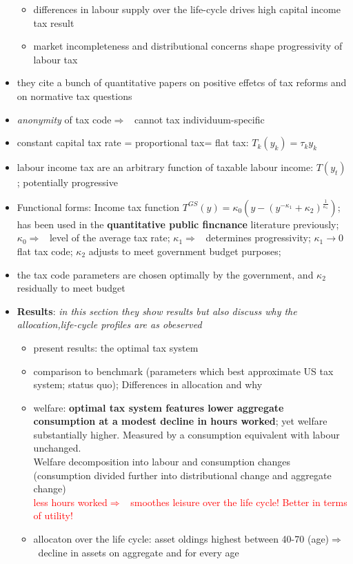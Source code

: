 \documentclass[12pt]{article}
\newcommand{\ar}{$\Rightarrow$ \ }
\newcommand{\tr}[1]{\textcolor{red}{#1}}
\begin{document}
\begin{itemize}
\begin{itemize}
\item differences in labour supply over the life-cycle drives high capital income tax result
\item market incompleteness and distributional concerns shape progressivity of labour tax
\end{itemize}
\item they cite a bunch of quantitative papers on positive effetcs of tax reforms and on normative tax questions
\item \textit{anonymity} of tax code\ar cannot tax individuum-specific
\item constant capital tax rate = proportional tax= flat tax: $T_k(y_k)=\tau_ky_k$
\item labour income tax are an arbitrary function of taxable labour income: $T(y_t)$; potentially progressive
\item Functional forms: Income tax function $T^{GS}(y)= \kappa_0(y-(y^{-\kappa_1}+\kappa_2)^{\frac{1}{\kappa_1}})$; has been used in the \textbf{quantitative public fincnance} literature previously; 
$\kappa_0$\ar level of the average tax rate; $\kappa_1$\ar determines progressivity; $\kappa_1\rightarrow0$ flat tax code; $\kappa_2$ adjusts to meet government budget purposes; 
\item the tax code parameters are chosen optimally by the government, and $\kappa_2$ residually to meet budget
\item \textbf{Results}: \textit{in this section they show results but also discuss why the allocation,life-cycle profiles are as obeserved} 
\begin{itemize}
\item present results: the optimal tax system
\item  comparison to benchmark (parameters which best approximate US tax system; status quo); Differences in allocation and why
\item welfare: \textbf{optimal tax system features lower aggregate consumption at a modest decline in hours worked}; yet welfare substantially higher. Measured by a consumption equivalent with labour unchanged. \\
Welfare decomposition into labour and consumption changes (consumption divided further into distributional change and aggregate change)\\
\tr{less hours worked\ar smoothes leisure over the life cycle! Better in terms of utility!}
\item allocaton over the life cycle: asset oldings highest between 40-70 (age)\ar decline in assets on aggregate and for every age

\end{itemize}
\end{itemize}
\end{document}
